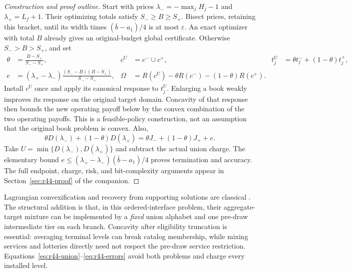 \begin{proof}[Construction and proof outline]
Start with prices $\lambda_-=-\max_jH_j-1$ and $\lambda_+=L_f+1$. Their optimizing totals satisfy $S_-\geq B\geq S_+$. Bisect prices, retaining this bracket, until its width times $(\bar b-a_1)/4$ is at most $\varepsilon$. An exact optimizer with total $B$ already gives an original-budget global certificate. Otherwise $S_->B>S_+$, and set
\begin{align}
 \theta&=\frac{B-S_+}{S_--S_+},&
 c^U&=c^-\cup c^+,& t_j^U&=\theta t_j^-+(1-\theta)t_j^+,\label{eq:r44-union}\\
 e&=(\lambda_+-\lambda_-)\frac{(S_--B)(B-S_+)}{S_--S_+},&
 \Omega&=R(c^U)-\theta R(c^-)-(1-\theta)R(c^+).\label{eq:r44-errors}
\end{align}
Install $c^U$ once and apply its canonical response to $t_j^U$. Enlarging a book weakly improves its response on the original target domain. Concavity of that response then bounds the new operating payoff below by the convex combination of the two operating payoffs. This is a feasible-policy construction, not an assumption that the original book problem is convex. Also,
\[
 \theta D(\lambda_-)+(1-\theta)D(\lambda_+)
 =\theta J_-+(1-\theta)J_++e.
\]
Take $U=\min\{D(\lambda_-),D(\lambda_+)\}$ and subtract the actual union charge. The elementary bound $e\leq(\lambda_+-\lambda_-)(\bar b-a_1)/4$ proves termination and accuracy. The full endpoint, charge, risk, and bit-complexity arguments appear in Section~\ref{sec:r44-proof} of the companion.
\end{proof}

Lagrangian convexification and recovery from supporting solutions are classical \citep{HandlerZang1980,Lemarechal2001}. The structural addition is that, in this ordered-interface problem, their aggregate-target mixture can be implemented by a \emph{fixed} union alphabet and one pre-draw intermediate tier on each branch. Concavity after eligibility truncation is essential: averaging terminal levels can break catalog membership, while mixing services and lotteries directly need not respect the pre-draw service restriction. Equations~\eqref{eq:r44-union}--\eqref{eq:r44-errors} avoid both problems and charge every installed level.

